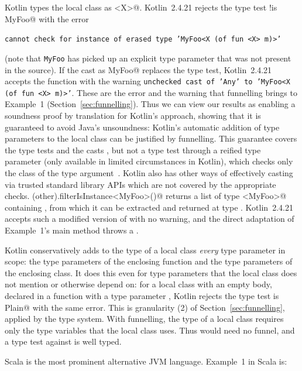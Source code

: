 Kotlin types the local class \Q@MyFoo@ as \Q@MyFoo<X>@.
Kotlin~2.4.21 rejects the type test \Q@other !is MyFoo@ with the error\\
\centerline{\texttt{cannot check for instance of erased type 'MyFoo<X (of fun <X> m)>'}} (note that \texttt{MyFoo} has picked up an explicit type parameter that was not present in the source).
If the cast \Q@other as MyFoo@ replaces the type test, Kotlin~2.4.21 accepts the function \Q@m@ with the warning \texttt{unchecked cast of 'Any' to 'MyFoo<X (of fun <X> m)>'}.
These are the error and the warning that funnelling brings to Example~1 (Section~\ref{sec:funnelling}).
Thus we can view our results as enabling a soundness proof by translation for Kotlin's approach, showing that it is guaranteed to avoid Java's unsoundness: Kotlin's automatic addition of type parameters to the local class can be justified by funnelling.
This guarantee covers the type tests \Q@is@ and the casts \Q@as@, but not a type test through a reified type parameter (only available in limited circumstances in Kotlin), which checks only the class of the type argument~\cite{kotlin_generics}.
Kotlin also has other ways of effectively casting via trusted standard library APIs which are not covered by the appropriate checks.
\Q@listOf(other).filterIsInstance<MyFoo>()@ returns a list of type \Q@List<MyFoo>@ containing \Q@other@, from which it can be extracted and returned at type \Q@MyFoo@. Kotlin~2.4.21 accepts such a modified version of \Q@m@ with no warning, and the direct adaptation of Example~1's main method throws a \Q@ClassCastException@. 

Kotlin conservatively adds to the type of a local class \emph{every} type parameter in scope: the type parameters of the enclosing function and the type parameters of the enclosing class.
It does this even for type parameters that the local class does not mention or otherwise depend on:
for a local class \Q@Plain@ with an empty body, declared in a function with a type parameter \Q@X@, Kotlin rejects the type test \Q@other is Plain@ with the same error.
This is granularity (2) of Section~\ref{sec:funnelling}, applied by the type system.
With funnelling, the type of a local class requires only the type variables that the local class uses.
Thus \Q@Plain@ would need no funnel, and a type test against \Q@Plain@ is well typed.

Scala is the most prominent alternative JVM language.
Example~1 in Scala is:

